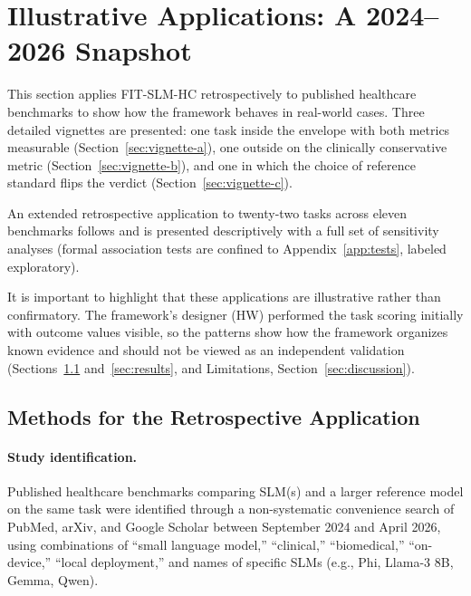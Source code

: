 \documentclass[11pt]{article}
\begin{document}
\section{Illustrative Applications: A 2024--2026 Snapshot}
\label{sec:snapshot}

This section applies FIT-SLM-HC retrospectively to published healthcare benchmarks to show how the framework behaves in real-world cases. Three detailed vignettes are presented: one task inside the envelope with both metrics measurable (Section~\ref{sec:vignette-a}), one outside on the clinically conservative metric (Section~\ref{sec:vignette-b}), and one in which the choice of reference standard flips the verdict (Section~\ref{sec:vignette-c}).

An extended retrospective application to twenty-two tasks across eleven benchmarks follows and is presented descriptively with a full set of sensitivity analyses (formal association tests are confined to Appendix~\ref{app:tests}, labeled exploratory).

It is important to highlight that these applications are illustrative rather than confirmatory. The framework's designer (HW) performed the task scoring initially with outcome values visible, so the patterns show how the framework organizes known evidence and should not be viewed as an independent validation (Sections~\ref{sec:methods-retro} and~\ref{sec:results}, and Limitations, Section~\ref{sec:discussion}).

\subsection{Methods for the Retrospective Application}
\label{sec:methods-retro}

\paragraph{Study identification.}
Published healthcare benchmarks comparing SLM(s) and a larger reference model on the same task were identified through a non-systematic convenience search of PubMed, arXiv, and Google Scholar between September 2024 and April 2026, using combinations of ``small language model,'' ``clinical,'' ``biomedical,'' ``on-device,'' ``local deployment,'' and names of specific SLMs (e.g., Phi, Llama-3 8B, Gemma, Qwen).
\end{document}
